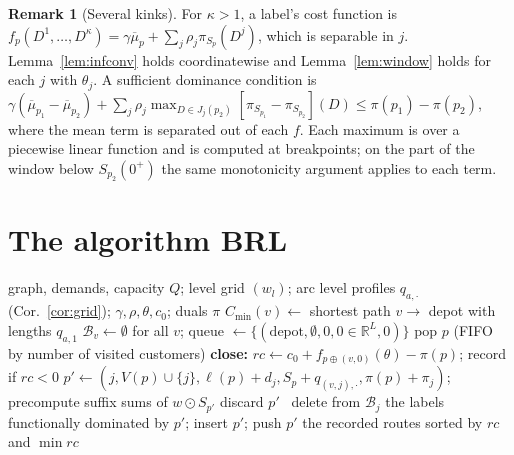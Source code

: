 \documentclass[11pt]{article}
\theoremstyle{definition}
\newtheorem{remark}[theorem]{Remark}
\newcommand{\R}{\mathbb{R}}
\newcommand{\mub}{\overline{\mu}}
\begin{document}
\begin{remark}[Several kinks]\label{rem:kappa}
For $\kappa>1$, a label's cost function is $f_p(D^1,\dots,D^\kappa)=\gamma\mub_p+\sum_j\rho_j\pi_{S_p}(D^j)$, which is separable in $j$. Lemma~\ref{lem:infconv} holds coordinatewise and Lemma~\ref{lem:window} holds for each $j$ with $\theta_j$. A sufficient dominance condition is
$\gamma(\mub_{p_1}-\mub_{p_2})+\sum_j\rho_j\max_{D\in J_j(p_2)}[\pi_{S_{p_1}}-\pi_{S_{p_2}}](D)\le\pi(p_1)-\pi(p_2)$,
where the mean term is separated out of each $f$. Each maximum is over a piecewise linear function and is computed at breakpoints; on the part of the window below $S_{p_2}(0^+)$ the same monotonicity argument applies to each term.
\end{remark}

\section{The algorithm BRL}\label{sec:alg}

\begin{algorithm}[h]
\caption{BRL: Budget-Resource Labelling (pricing for the dependence-robust VRP)}\label{alg:brl}
\begin{algorithmic}[1]
\Require graph, demands, capacity $Q$; level grid $(w_l)$; arc level profiles $q_{a,\cdot}$ (Cor.~\ref{cor:grid}); $\gamma,\rho,\theta,c_0$; duals $\pi$
\State $C_{\min}(v)\gets$ shortest path $v\to$ depot with lengths $q_{a,1}$ 
\State $\mathcal B_v\gets\emptyset$ for all $v$; queue $\gets\{(\text{depot},\emptyset,0,0\in\R^L,0)\}$
  \State pop $p$ (FIFO by number of visited customers)
  \State \textbf{close:} $rc\gets c_0+f_{p\oplus(v,0)}(\theta)-\pi(p)$; record if $rc<0$
    \State $p'\gets(j,V(p)\cup\{j\},\ell(p)+d_j,S_p+q_{(v,j),\cdot},\pi(p)+\pi_j)$; precompute suffix sums of $w\odot S_{p'}$
     discard $p'$ 
    \Else\ delete from $\mathcal B_j$ the labels functionally dominated by $p'$; insert $p'$; push $p'$
    \EndIf
  \EndFor
\EndWhile
\State \Return the recorded routes sorted by $rc$ and $\min rc$
\end{algorithmic}
\end{algorithm}
\end{document}
